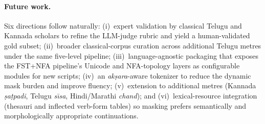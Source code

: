 \documentclass[11pt]{article}
\begin{document}
\paragraph{Future work.}
Six directions follow naturally: (i)~expert validation by classical
Telugu and Kannada scholars to refine the LLM-judge rubric and yield a
human-validated gold subset; (ii)~broader classical-corpus curation
across additional Telugu metres under the same five-level pipeline;
(iii)~language-agnostic packaging that exposes the FST+NFA pipeline's
Unicode and NFA-topology layers as configurable modules for new
scripts; (iv)~an \textit{ak\d{s}ara}-aware tokenizer to reduce the
dynamic mask burden and improve fluency; (v)~extension to additional
metres (Kannada \textit{\d{s}a\d{t}padi}, Telugu \textit{s\={\i}sa},
Hindi/Marathi \textit{chand}); and (vi)~lexical-resource integration
(thesauri and inflected verb-form tables) so masking prefers
semantically and morphologically appropriate continuations.
\end{document}
